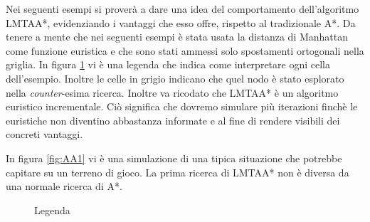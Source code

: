 \documentclass[11pt]{book}
\begin{document}
\par{ Nei seguenti esempi si prover\`a a dare una idea del comportamento dell'algoritmo LMTAA*, evidenziando i vantaggi che esso offre, rispetto al tradizionale A*.
Da tenere a mente che nei seguenti esempi \`e stata usata la distanza di Manhattan come funzione euristica e che sono stati ammessi solo spostamenti ortogonali nella griglia. In figura \ref{fig:legenda} vi \`e una legenda che indica come interpretare ogni cella dell'esempio. Inoltre le celle in grigio indicano che quel nodo \`e stato esplorato nella \emph{counter}-esima ricerca. Inoltre va ricodato che LMTAA* \`e un algoritmo euristico incrementale. Ci\`o significa che dovremo simulare pi\`u iterazioni finch\`e le euristiche non diventino abbastanza informate e al fine di rendere visibili dei concreti vantaggi.
}\par{In figura \ref{fig:AA1} vi \`e una simulazione di una tipica situazione che potrebbe capitare su un terreno di gioco. La prima ricerca di LMTAA* non \`e diversa da una normale ricerca di A*.} 
\begin{figure}[h]
\centering
{}
\caption{Legenda}
\label{fig:legenda}
\end{figure}
\end{document}
